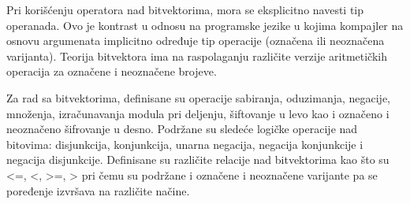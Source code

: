 \documentclass[12pt,oneside]{memoir}
\begin{document}
Pri korišćenju operatora nad bitvektorima, mora se eksplicitno navesti tip operanada. Ovo je kontrast u odnosu na programske jezike u kojima kompajler na osnovu argumenata implicitno određuje tip operacije (označena ili neoznačena varijanta).
Teorija bitvektora ima na raspolaganju različite verzije aritmetičkih operacija za označene i neoznačene brojeve. 
\par

Za rad sa bitvektorima, definisane su operacije sabiranja, oduzimanja, negacije, množenja, izračunavanja modula pri deljenju, šiftovanje u levo kao i označeno i neoznačeno šifrovanje u desno. Podržane su sledeće logičke operacije nad bitovima: disjunkcija, konjunkcija, unarna negacija, negacija konjunkcije i negacija disjunkcije. Definisane su različite relacije nad bitvektorima kao što su <=, <, >=, > pri čemu su podržane i označene i neoznačene varijante pa se poređenje izvršava na različite načine. 
\end{document}
